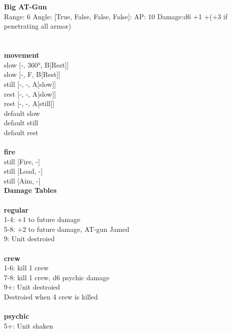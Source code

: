 \ \\

\ \\
{\bf Big AT-Gun } \\



Range: 6  Angle: [True, False, False, False]: AP: 10 Damage:d6 +1 +(+3 if penetrating all armor) \\




 
\ \\



\ \\ {\bf movement } \\
slow [-, 360°, B[Rest]] \\
slow [-, F, B[Rest]] \\
still [-, -, A[slow]] \\
rest [-, -, A[slow]] \\
rest [-, -, A[still]] \\
default slow \\
default still \\
default rest \\
\ \\ {\bf fire } \\
still [Fire, -] \\
still [Load, -] \\
still [Aim, -] \\


{\bf Damage Tables} \\
\ \\ {\bf regular } \\
1-4: +1 to future damage \\
5-8: +2 to future damage, AT-gun Jamed \\
9: Unit destroied \\
\ \\ {\bf crew } \\
1-6: kill 1 crew \\
7-8: kill 1 crew, d6 psychic damage \\
9+: Unit destroied \\
Destroied when 4 crew is killed \\
\ \\ {\bf psychic } \\
5+: Unit shaken \\










